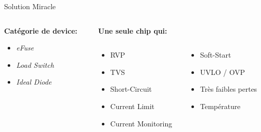 \begin{frame}{Solution Miracle}
    \vspace{-12pt}
    \begin{columns}
        \begin{column}{0.33\textwidth}
            \textbf<1>{Catégorie de device:}
            \begin{itemize}
                \item<1-> \textit{eFuse}
                \item<1-> \textit{Load Switch}
                \item<1-> \textit{Ideal Diode}
            \end{itemize}
        \end{column}
        \pause
        \begin{column}{0.66\textwidth}
            \begin{center}
                \textbf{Une seule chip qui:}
            \end{center}
            \begin{columns}
                \begin{column}{0.5\textwidth}
                    \begin{itemize}
                        \item \small{RVP}
                        \item \small{TVS}
                        \item \small{Short-Circuit}
                        \item \small{Current Limit}
                        \item \small{Current Monitoring}
                    \end{itemize}
                \end{column}
                \begin{column}{0.5\textwidth}
                    \begin{itemize}
                        \item \small{Soft-Start}
                        \item \small{UVLO / OVP}
                        \item \small{Très faibles pertes}
                        \item \small{Température}
                    \end{itemize}
                \end{column}
            \end{columns}
            

\end{column}
\end{columns}
\end{frame}
